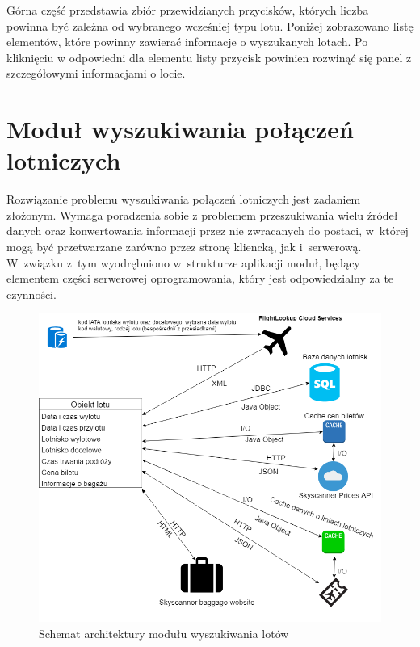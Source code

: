 \documentclass[12pt, twoside]{report}
\begin{document}
\noindent Górna część przedstawia zbiór przewidzianych przycisków, których liczba powinna być zależna od wybranego wcześniej typu lotu. Poniżej zobrazowano listę elementów, które powinny zawierać informacje o wyszukanych lotach. Po kliknięciu w odpowiedni dla elementu listy przycisk powinien rozwinąć się panel z szczegółowymi informacjami o locie.

\section{Moduł wyszukiwania połączeń lotniczych}
Rozwiązanie problemu wyszukiwania połączeń lotniczych jest zadaniem złożonym. Wymaga poradzenia sobie z problemem przeszukiwania wielu źródeł danych oraz konwertowania informacji przez nie zwracanych do postaci, w~której mogą być przetwarzane zarówno przez stronę kliencką, jak i~serwerową. W~związku z~tym wyodrębniono w~strukturze aplikacji moduł, będący elementem części serwerowej oprogramowania, który jest odpowiedzialny za te czynności.

\begin{figure}[!ht]
\centering
\includegraphics[scale=0.50, keepaspectratio]{search_module.png}
\caption{Schemat architektury modułu wyszukiwania lotów}
\label{fig:search_module}
\end{figure}
\end{document}
